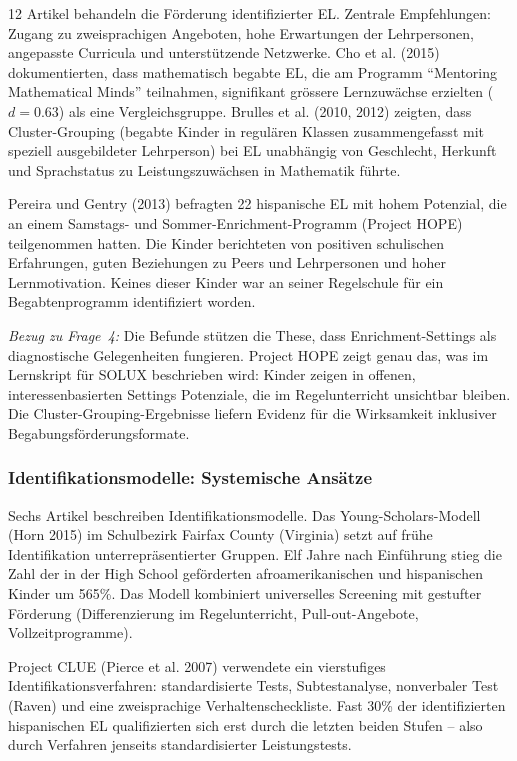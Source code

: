 \documentclass[ngerman, a4paper]{article}
\begin{document}
12 Artikel behandeln die Förderung identifizierter EL. Zentrale
Empfehlungen: Zugang zu zweisprachigen Angeboten, hohe Erwartungen der
Lehrpersonen, angepasste Curricula und unterstützende Netzwerke. Cho et al.
(2015) dokumentierten, dass mathematisch begabte EL, die am Programm
\enquote{Mentoring Mathematical Minds} teilnahmen, signifikant grössere
Lernzuwächse erzielten ($d = 0.63$) als eine Vergleichsgruppe. Brulles
et al. (2010, 2012) zeigten, dass Cluster-Grouping (begabte Kinder in
regulären Klassen zusammengefasst mit speziell ausgebildeter Lehrperson)
bei EL unabhängig von Geschlecht, Herkunft und Sprachstatus zu
Leistungszuwächsen in Mathematik führte.

Pereira und Gentry (2013) befragten 22 hispanische EL mit hohem
Potenzial, die an einem Samstags- und Sommer-Enrichment-Programm (Project
HOPE) teilgenommen hatten. Die Kinder berichteten von positiven
schulischen Erfahrungen, guten Beziehungen zu Peers und Lehrpersonen und
hoher Lernmotivation. Keines dieser Kinder war an seiner Regelschule für
ein Begabtenprogramm identifiziert worden.

\textit{Bezug zu Frage~4:} Die Befunde stützen die These, dass
Enrichment-Settings als diagnostische Gelegenheiten fungieren. Project
HOPE zeigt genau das, was im Lernskript für SOLUX beschrieben wird:
Kinder zeigen in offenen, interessenbasierten Settings Potenziale, die im
Regelunterricht unsichtbar bleiben. Die Cluster-Grouping-Ergebnisse
liefern Evidenz für die Wirksamkeit inklusiver
Begabungsförderungsformate.

\subsubsection*{Identifikationsmodelle: Systemische Ansätze}

Sechs Artikel beschreiben Identifikationsmodelle. Das
Young-Scholars-Modell (Horn 2015) im Schulbezirk Fairfax County
(Virginia) setzt auf frühe Identifikation unterrepräsentierter Gruppen.
Elf Jahre nach Einführung stieg die Zahl der in der High School
geförderten afroamerikanischen und hispanischen Kinder um 565\%. Das
Modell kombiniert universelles Screening mit gestufter Förderung
(Differenzierung im Regelunterricht, Pull-out-Angebote,
Vollzeitprogramme).

Project CLUE (Pierce et al. 2007) verwendete ein vierstufiges
Identifikationsverfahren: standardisierte Tests, Subtestanalyse,
nonverbaler Test (Raven) und eine zweisprachige Verhaltenscheckliste.
Fast 30\% der identifizierten hispanischen EL qualifizierten sich erst
durch die letzten beiden Stufen -- also durch Verfahren jenseits
standardisierter Leistungstests.
\end{document}
